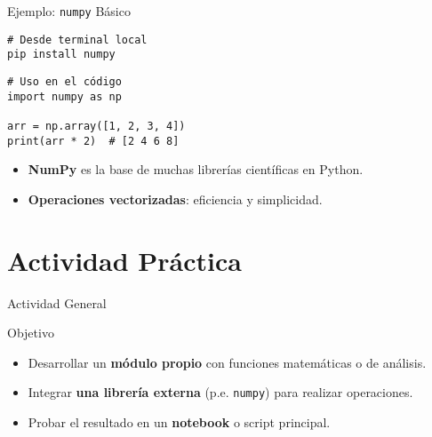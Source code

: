\documentclass[10pt]{beamer}
\begin{document}
\begin{frame}[fragile]{Ejemplo: \texttt{numpy} Básico}
\begin{verbatim}
# Desde terminal local
pip install numpy
\end{verbatim}
\begin{verbatim}
# Uso en el código
import numpy as np

arr = np.array([1, 2, 3, 4])
print(arr * 2)  # [2 4 6 8]
\end{verbatim}
\begin{itemize}
  \item \textbf{NumPy} es la base de muchas librerías científicas en Python.
  \item \textbf{Operaciones vectorizadas}: eficiencia y simplicidad.
\end{itemize}
\end{frame}

\section{Actividad Práctica}

\begin{frame}{Actividad General}
  \begin{block}{Objetivo}
    \begin{itemize}
      \item Desarrollar un \textbf{módulo propio} con funciones matemáticas o de análisis.
      \item Integrar \textbf{una librería externa} (p.e. \texttt{numpy}) para realizar operaciones.
      \item Probar el resultado en un \textbf{notebook} o script principal.
    \end{itemize}
  \end{block}
\end{frame}
\end{document}
